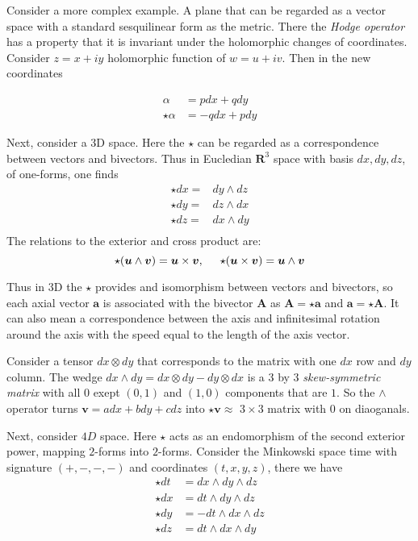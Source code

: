 {    Consider a more complex example. A plane that can be regarded as a vector space with a standard sesquilinear form as the metric. 
    There the \textit{Hodge operator} has a property that it is invariant under the holomorphic changes of coordinates. 
    Consider $z = x + iy$ holomorphic function of $w=u + iv$. Then in the new coordinates 
    
    \begin{align}
        \alpha &= pdx +qdy \\
        \star \alpha &= -q dx + p dy
    \end{align}
    
    Next, consider a 3D space. 
    Here the $\star$ can be regarded as a correspondence between vectors and bivectors. 
    Thus in Eucledian $\boldsymbol{R}^3$ space with basis $dx,dy,dz$, of one-forms, one finds
    \begin{align}
        \star dx =& dy\wedge dz \\
        \star dy =& dz\wedge dx \\
        \star dz =& dx \wedge dy \\
    \end{align}
    The relations to the exterior and cross product are:
    \begin{equation}
        \star(\boldsymbol{u}\wedge\boldsymbol{v})=\boldsymbol{u}\times\boldsymbol{v}, \hspace{5mm}\star(\boldsymbol{u}\times\boldsymbol{v}) = \boldsymbol{u}\wedge\boldsymbol{v}
    \end{equation}
    
    Thus in 3D the $\star$ provides and isomorphism between vectors and bivectors, so each axial vector $\boldsymbol{a}$ is associated with the bivector $\boldsymbol{A}$ as $\boldsymbol{A} = \star\boldsymbol{a}$ and $\boldsymbol{a} = \star\boldsymbol{A}$. It can also mean a correspondence between the axis and infinitesimal rotation around the axis with the speed equal to the length of the axis vector.
    
    Consider a tensor $dx \otimes dy$ that corresponds to the matrix with one $dx$ row and $dy$ column. The wedge $dx\wedge dy = dx\otimes dy - dy\otimes dx$ is a 3 by 3 \textit{skew-symmetric matrix} with all $0$ exept $(0,1)$ and $(1,0)$ components that are $1$. 
    So the $\wedge$ operator turns $\boldsymbol{v} = adx + bdy + cdz$ into $\star\boldsymbol{v}\approx$ $3\times 3$ matrix with $0$ on diaoganals.
    
    Next, consider $4D$ space.
    Here $\star$ acts as an endomorphism of the second exterior power, mapping $2$-forms into $2$-forms. 
    Consider the Minkowski space time with signature $(+,-,-,-)$ and coordinates $(t,x,y,z)$, there we have
    \begin{align}
        \star dt &= dx \wedge dy \wedge dz \\
        \star dx &= dt \wedge dy \wedge dz \\
        \star dy &= -dt \wedge dx \wedge dz \\ 
        \star dz &= dt \wedge dx \wedge dy 
    \end{align}
    
}
